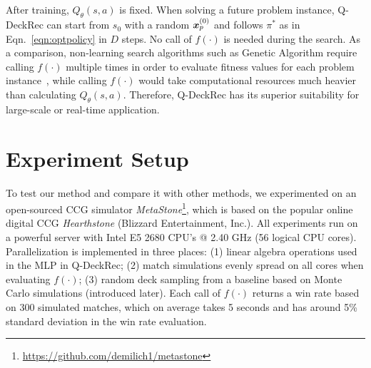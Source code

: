 After training, $Q_\theta(s,a)$ is fixed. When solving a future problem instance, Q-DeckRec can start from $s_0$ with a random $\boldsymbol{x}_p^{(0)}$ and follows $\pi^*$ as in Eqn.~\ref{eqn:optpolicy} in $D$ steps. No call of $f(\cdot)$ is needed during the search. As a comparison, non-learning search algorithms such as Genetic Algorithm require calling $f(
\cdot)$ multiple times in order to evaluate fitness values for each problem instance~\citep{garcia2016evolutionary,bjorke2017deckbuilding}, while calling $f(\cdot)$ would take computational resources much heavier than calculating $Q_\theta(s,a)$. Therefore, Q-DeckRec has its superior suitability for large-scale or real-time application.

\section{Experiment Setup}\label{sec:qdeckrec_exp}
To test our method and compare it with other methods, we experimented on an open-sourced CCG simulator \textit{MetaStone}\footnote{\url{https://github.com/demilich1/metastone}}, which is  based on the popular online digital CCG \textit{Hearthstone} (Blizzard Entertainment, Inc.). All experiments run on a powerful server with Intel E5 2680 CPU’s @ 2.40 GHz (56 logical CPU cores). Parallelization is implemented in three places: (1) linear algebra operations used in the MLP in Q-DeckRec; (2) match simulations evenly spread on all cores when evaluating $f(\cdot)$; (3) random deck sampling from a baseline based on Monte Carlo simulations (introduced later). Each call of $f(\cdot)$ returns a win rate based on 300 simulated matches, which on average takes 5 seconds and has around 5\% standard deviation in the win rate evaluation. 


